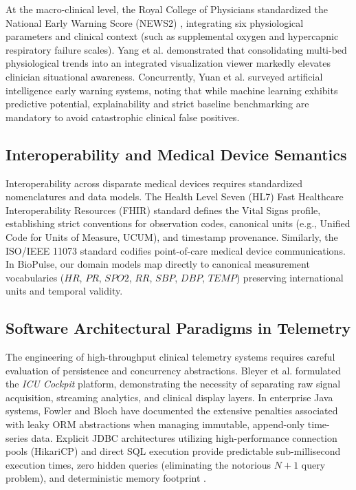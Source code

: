 \documentclass[10pt,journal,compsoc]{IEEEtran}
\begin{document}
At the macro-clinical level, the Royal College of Physicians standardized the National Early Warning Score (NEWS2) \cite{rcp2017news2}, integrating six physiological parameters and clinical context (such as supplemental oxygen and hypercapnic respiratory failure scales). Yang et al. \cite{yang2024icu} demonstrated that consolidating multi-bed physiological trends into an integrated visualization viewer markedly elevates clinician situational awareness. Concurrently, Yuan et al. \cite{yuan2025ai} surveyed artificial intelligence early warning systems, noting that while machine learning exhibits predictive potential, explainability and strict baseline benchmarking are mandatory to avoid catastrophic clinical false positives.

\subsection{Interoperability and Medical Device Semantics}
Interoperability across disparate medical devices requires standardized nomenclatures and data models. The Health Level Seven (HL7) Fast Healthcare Interoperability Resources (FHIR) standard \cite{hl7fhir2020} defines the Vital Signs profile, establishing strict conventions for observation codes, canonical units (e.g., Unified Code for Units of Measure, UCUM), and timestamp provenance. Similarly, the ISO/IEEE 11073 standard \cite{isoieee11073} codifies point-of-care medical device communications. In BioPulse, our domain models map directly to canonical measurement vocabularies ($HR$, $PR$, $SPO2$, $RR$, $SBP$, $DBP$, $TEMP$) preserving international units and temporal validity.

\subsection{Software Architectural Paradigms in Telemetry}
The engineering of high-throughput clinical telemetry systems requires careful evaluation of persistence and concurrency abstractions. Bleyer et al. \cite{bleyer2022icucockpit} formulated the \textit{ICU Cockpit} platform, demonstrating the necessity of separating raw signal acquisition, streaming analytics, and clinical display layers. In enterprise Java systems, Fowler \cite{fowler2002patterns} and Bloch \cite{bloch2018effective} have documented the extensive penalties associated with leaky ORM abstractions when managing immutable, append-only time-series data. Explicit JDBC architectures utilizing high-performance connection pools (HikariCP) and direct SQL execution provide predictable sub-millisecond execution times, zero hidden queries (eliminating the notorious $N+1$ query problem), and deterministic memory footprint \cite{walls2022spring}.
\end{document}
